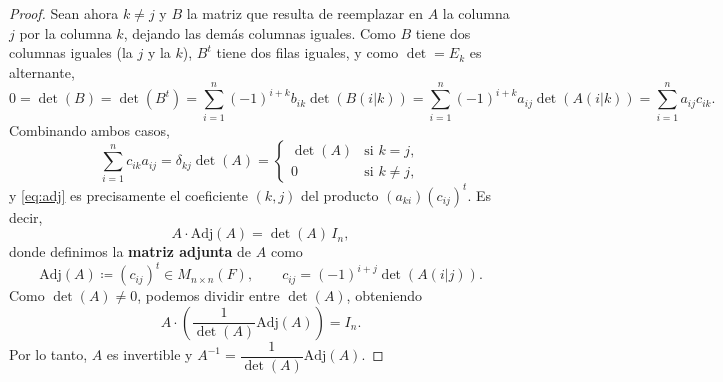 \documentclass[12pt,a4paper]{book}
\newcommand{\parentesis}[1]{\left(#1\right)}
\begin{document}
\begin{proof}
        Sean ahora $k \neq j$ y $B$ la matriz que resulta de reemplazar en $A$ la columna $j$ por la columna $k$, dejando las demás columnas iguales. Como $B$ tiene dos columnas iguales (la $j$ y la $k$), $B^t$ tiene dos filas iguales, y como $\det = E_k$ es alternante,
        \begin{equation*}
            0 = \det(B) = \det(B^t) = \sum_{i=1}^n (-1)^{i+k} b_{ik} \det(B(i|k)) = \sum_{i=1}^n (-1)^{i+k} a_{ij} \det(A(i|k)) = \sum_{i=1}^n a_{ij} c_{ik}.
        \end{equation*}
        Combinando ambos casos,
        \begin{equation}
            \sum_{i=1}^n c_{ik} a_{ij} = \delta_{kj} \det(A) =
            \begin{cases}
                \det(A) & \text{si } k = j, \\
                0 & \text{si } k \neq j,
            \end{cases}
            \label{eq:adj}
        \end{equation}
        y \eqref{eq:adj} es precisamente el coeficiente $(k,j)$ del producto $(a_{ki})(c_{ij})^t$. Es decir,
        \begin{equation*}
            A \cdot \text{Adj}(A) = \det(A) \, I_n,
        \end{equation*}
        donde definimos la \textbf{matriz adjunta} de $A$ como
        \begin{equation*}
            \text{Adj}(A) \coloneqq (c_{ij})^t \in M_{n \times n}(F), \qquad c_{ij} = (-1)^{i+j} \det(A(i|j)).
        \end{equation*}
        Como $\det(A) \neq 0$, podemos dividir entre $\det(A)$, obteniendo
        \begin{equation*}
            A \cdot \parentesis{\frac{1}{\det(A)} \text{Adj}(A)} = I_n.
        \end{equation*}
        Por lo tanto, $A$ es invertible y $A^{-1} = \dfrac{1}{\det(A)} \text{Adj}(A)$.
    \end{proof}
\end{document}
